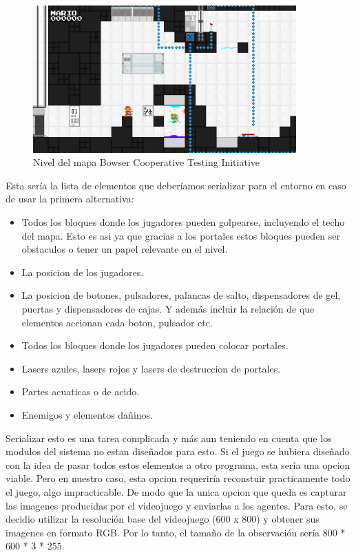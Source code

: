 \begin{figure}[h]
    \centering
    \includegraphics[width=0.9\textwidth]{img/BCTI_observation.png}
    \caption{Nivel del mapa Bowser Cooperative Testing Initiative \cite {mari0-mapa}}
    \label{fig:observartion}
\end{figure}

Esta sería la lista de elementos que deberíamos serializar para el entorno en caso de usar la primera alternativa:

\begin{itemize}
    \item Todos los bloques donde los jugadores pueden golpearse, incluyendo el techo del mapa. Esto es asi ya que gracias a los portales estos bloques pueden ser obstaculos o tener un papel relevante en el nivel.
    \item La posicion de los jugadores.
    \item La posicion de botones, pulsadores, palancas de salto, dispensadores de gel, puertas y dispensadores de cajas. Y además incluir la relación de que elementos accionan cada boton, pulsador etc.
    \item Todos los bloques donde los jugadores pueden colocar portales.
    \item Lasers azules, lasers rojos y lasers de destruccion de portales.
    \item Partes acuaticas o de acido.
    \item Enemigos y elementos dañinos.
\end{itemize}

Serializar esto es una tarea complicada y más aun teniendo en cuenta que los modulos del sistema no estan diseñados para esto. Si el juego se hubiera diseñado con la idea de pasar todos estos elementos a otro programa, esta sería una opcion viable. Pero en nuestro caso, esta opcion requeriría reconstuir practicamente todo el juego, algo impracticable. De modo que la unica opcion que queda es capturar las imagenes producidas por el videojuego y enviarlas a los agentes. Para esto, se decidio utilizar la resolución base del videojuego (600 x 800) y obtener sus imagenes en formato RGB. Por lo tanto, el tamaño de la observación sería 800 * 600 * 3 * 255.